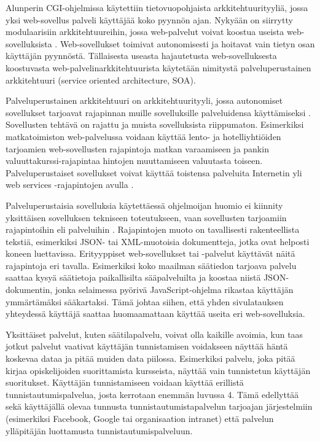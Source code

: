 Alunperin CGI-ohjelmissa käytettiin tietovuopohjaista arkkitehtuurityyliä, jossa yksi web-sovellus palveli käyttäjää koko pyynnön ajan. Nykyään on siirrytty modulaarisiin arkkitehtuureihin, jossa web-palvelut voivat koostua useista web-sovelluksista \cite{soa}. Web-sovellukset toimivat autonomisesti ja hoitavat vain tietyn osan käyttäjän pyynnöstä. Tällaisesta useasta hajautetusta web-sovelluksesta koostuvasta web-palvelinarkkitehtuurista käytetään nimitystä palveluperustainen arkkitehtuuri (service oriented architecture, SOA).

Palveluperustainen arkkitehtuuri on arkkitehtuurityyli, jossa autonomiset sovellukset tarjoavat rajapinnan muille sovelluksille palveluidensa käyttämiseksi \cite{soa}. Sovellusten tehtävä on rajattu ja muista sovelluksista riippumaton. Esimerkiksi matkatoimiston web-palvelussa voidaan käyttää lento- ja hotelliyhtiöiden tarjoamien web-sovellusten rajapintoja matkan varaamiseen ja pankin valuuttakurssi-rajapintaa hintojen muuttamiseen valuutasta toiseen. Palveluperustaiset sovellukset voivat käyttää toistensa palveluita Internetin yli web services -rajapintojen avulla \cite{soa}.

Palveluperustaisia sovelluksia käytettäessä ohjelmoijan huomio ei kiinnity yksittäisen sovelluksen tekniseen toteutukseen, vaan sovellusten tarjoamiin rajapintoihin eli palveluihin \cite{soa}. Rajapintojen muoto on tavallisesti rakenteellista tekstiä, esimerkiksi JSON- tai XML-muotoisia dokumentteja, jotka ovat helposti koneen luettavissa. Erityyppiset web-sovellukset tai -palvelut käyttävät näitä rajapintoja eri tavalla. Esimerkiksi koko maailman säätiedon tarjoava palvelu saattaa kysyä säätietoja paikallisilta sääpalveluilta ja koostaa niistä JSON-dokumentin, jonka selaimessa pyörivä JavaScript-ohjelma rikastaa käyttäjän ymmärtämäksi sääkartaksi. Tämä johtaa siihen, että yhden sivulatauksen yhteydessä käyttäjä saattaa huomaamattaan käyttää useita eri web-sovelluksia.

Yksittäiset palvelut, kuten säätilapalvelu, voivat olla kaikille avoimia, kun taas jotkut palvelut vaativat käyttäjän tunnistamisen voidakseen näyttää häntä koskevaa dataa ja pitää muiden data piilossa. Esimerkiksi palvelu, joka pitää kirjaa opiskelijoiden suorittamista kursseista, näyttää vain tunnistetun käyttäjän suoritukset. Käyttäjän tunnistamiseen voidaan käyttää erillistä tunnistautumispalvelua, josta kerrotaan enemmän luvussa 4. Tämä edellyttää sekä käyttäjällä olevaa tunnusta tunnistautumistapalvelun tarjoajan järjestelmiin (esimerkiksi Facebook, Google tai organisaation intranet) että palvelun ylläpitäjän luottamusta tunnistautumispalveluun.